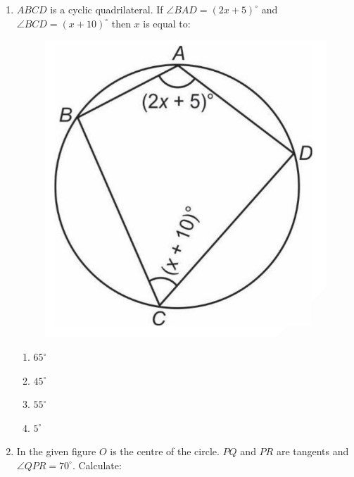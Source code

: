 \begin{enumerate}
	\item $ABCD$ is a cyclic quadrilateral. If $\angle BAD = (2x + 5)^{\circ}$ and $\angle BCD = (x + 10)^{\circ}$ then $x$ is equal to:
		\begin{figure}[h]
			\includegraphics[width=\columnwidth]{figs/img2.jpg}
			\caption{}
			\label{figure}
		\end{figure}
		\begin{enumerate}
			\item $65^{\circ}$
			\item $45^{\circ}$
			\item $55^{\circ}$
			\item $5^{\circ}$
		\end{enumerate}
		\newpage
	\item In the given figure $O$ is the centre of the circle. $PQ$ and $PR$ are tangents and $\angle QPR = 70^{\circ}$. Calculate:
		{\begin{figure}[h]

\end{figure}}
\end{enumerate}
